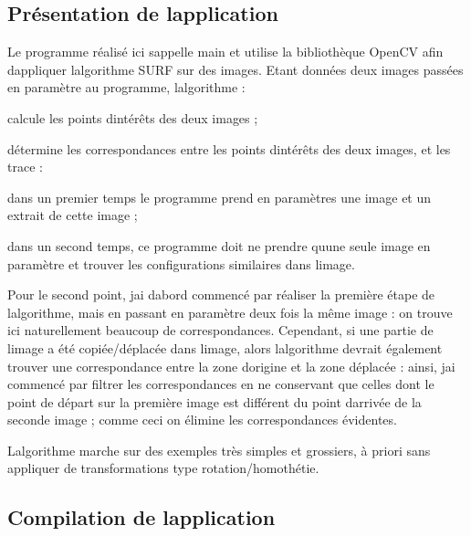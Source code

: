 \subsection*{Présentation de l\textquotesingle{}application}

Le programme réalisé ici s\textquotesingle{}appelle {\ttfamily main} et utilise la bibliothèque Open\+CV afin d\textquotesingle{}appliquer l\textquotesingle{}algorithme S\+U\+RF sur des images. Etant données deux images passées en paramètre au programme, l\textquotesingle{}algorithme \+:
\begin{DoxyItemize}
\item calcule les points d\textquotesingle{}intérêts des deux images ;
\item détermine les correspondances entre les points d\textquotesingle{}intérêts des deux images, et les trace \+:
\begin{DoxyItemize}
\item dans un premier temps le programme prend en paramètres une image et un extrait de cette image ;
\item dans un second temps, ce programme doit ne prendre qu\textquotesingle{}une seule image en paramètre et trouver les configurations similaires dans l\textquotesingle{}image.
\end{DoxyItemize}
\end{DoxyItemize}

Pour le second point, j\textquotesingle{}ai d\textquotesingle{}abord commencé par réaliser la première étape de l\textquotesingle{}algorithme, mais en passant en paramètre deux fois la même image \+: on trouve ici naturellement beaucoup de correspondances. Cependant, si une partie de l\textquotesingle{}image a été copiée/déplacée dans l\textquotesingle{}image, alors l\textquotesingle{}algorithme devrait également trouver une correspondance entre la zone d\textquotesingle{}origine et la zone déplacée \+: ainsi, j\textquotesingle{}ai commencé par filtrer les correspondances en ne conservant que celles dont le point de départ sur la première image est différent du point d\textquotesingle{}arrivée de la seconde image ; comme ceci on élimine les correspondances évidentes.

L\textquotesingle{}algorithme marche sur des exemples très simples et grossiers, à priori sans appliquer de transformations type rotation/homothétie.

\subsection*{Compilation de l\textquotesingle{}application}

